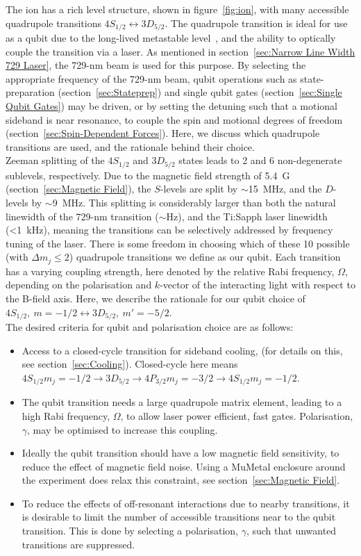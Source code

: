     The \ca ion has a rich level structure, shown in figure~\ref{fig:ion}, with many accessible quadrupole transitions $4S_{1/2}\leftrightarrow 3D_{5/2}$. The quadrupole transition is ideal for use as a qubit due to the long-lived metastable level~\cite{barton2000measurement}, and the ability to optically couple the transition via a laser. As mentioned in section~\ref{sec:Narrow Line Width 729 Laser}, the 729-nm beam is used for this purpose. By selecting the appropriate frequency of the 729-nm beam, qubit operations such as state-preparation (section~\ref{sec:Stateprep}) and single qubit gates (section~\ref{sec:Single Qubit Gates}) may be driven, or by setting the detuning such that a motional sideband is near resonance, to couple the spin and motional degrees of freedom (section~\ref{sec:Spin-Dependent Forces}). Here, we discuss which quadrupole transitions are used, and the rationale behind their choice.\\ 
    Zeeman splitting of the $4S_{1/2}$ and $3D_{5/2}$ states leads to 2 and 6
    non-degenerate sublevels, respectively. Due to the magnetic field strength of 5.4~G (section~\ref{sec:Magnetic Field}),
    the $S$-levels are split by $\sim$15~\unit{\MHz}, and the $D$-levels by $\sim$9~\unit{\MHz}.
    This splitting is considerably larger than both the natural linewidth of the
    729-nm transition ($\sim$\unit{\Hz}), and the Ti:Sapph laser linewidth (<1~\unit{\kHz}), meaning the transitions can be 
    selectively addressed by frequency tuning of the laser. There is some freedom in choosing which of these 10 possible (with $\Delta m_j \leq 2$) quadrupole transitions we define as our qubit. Each transition has a varying coupling strength, here denoted by the relative Rabi frequency, $\Omega$, depending on the polarisation and $k$-vector of the interacting light with respect to the B-field axis. Here, we describe the rationale for our qubit choice of $4S_{1/2},~m = -1/2 \leftrightarrow 3D_{5/2}, ~m' = -5/2$.\\
    The desired criteria for qubit and polarisation choice are as follows:
    \begin{itemize}
    \item Access to a closed-cycle transition for sideband cooling, (for details on this, see section~\ref{sec:Cooling}). Closed-cycle here means $4S_{1/2} m_j = -1/2 \rightarrow 3D_{5/2} \rightarrow 4P_{3/2} m_j = -3/2 \rightarrow 4S_{1/2} m_j = -1/2$.
    \item The qubit transition needs a large quadrupole matrix element, leading to a high Rabi frequency, $\Omega$, to allow laser power efficient, fast gates. Polarisation, $\gamma$, may be optimised to increase this coupling.
    \item Ideally the qubit transition should have a low magnetic field sensitivity, to reduce the effect of magnetic field noise. Using a MuMetal enclosure around the experiment does relax this constraint, see section~\ref{sec:Magnetic Field}.
    \item To reduce the effects of off-resonant interactions due to nearby transitions, it is desirable to limit the number of accessible transitions near to the qubit transition. This is done by selecting a polarisation, $\gamma$, such that unwanted transitions are suppressed.
    \end{itemize}
